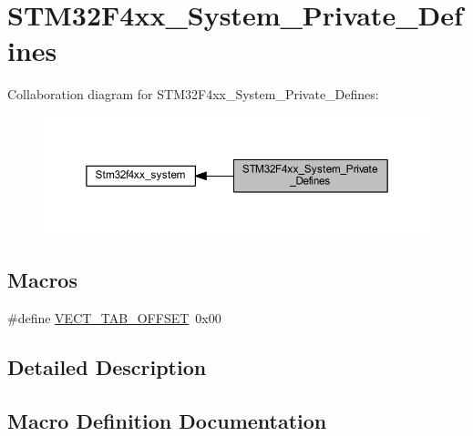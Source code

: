 \hypertarget{group___s_t_m32_f4xx___system___private___defines}{}\section{S\+T\+M32\+F4xx\+\_\+\+System\+\_\+\+Private\+\_\+\+Defines}
\label{group___s_t_m32_f4xx___system___private___defines}
Collaboration diagram for S\+T\+M32\+F4xx\+\_\+\+System\+\_\+\+Private\+\_\+\+Defines\+:\nopagebreak
\begin{figure}[H]
\begin{center}
\leavevmode
\includegraphics[width=350pt]{group___s_t_m32_f4xx___system___private___defines}
\end{center}
\end{figure}
\subsection*{Macros}
\begin{DoxyCompactItemize}
\item 
\#define \mbox{\hyperlink{group___s_t_m32_f4xx___system___private___defines_ga40e1495541cbb4acbe3f1819bd87a9fe}{V\+E\+C\+T\+\_\+\+T\+A\+B\+\_\+\+O\+F\+F\+S\+ET}}~0x00
\end{DoxyCompactItemize}


\subsection{Detailed Description}


\subsection{Macro Definition Documentation}
\mbox{\label{group___s_t_m32_f4xx___system___private___defines_ga40e1495541cbb4acbe3f1819bd87a9fe}} 
